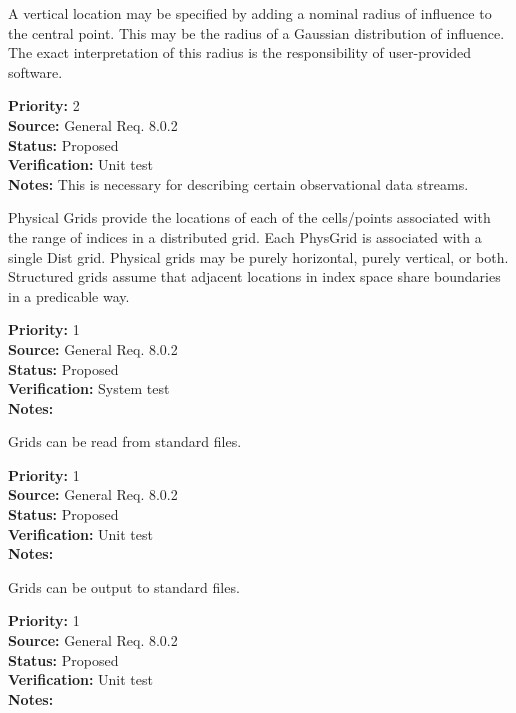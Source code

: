 
  A vertical location may be specified by adding a nominal radius of
influence to the central point.  This may be the radius of a Gaussian
distribution of influence. The exact interpretation of this radius is
the responsibility of user-provided software.
\begin{reqlist}
{\bf Priority:} 2 \\
{\bf Source:} General Req. 8.0.2 \\
{\bf Status:} Proposed \\
{\bf Verification:} Unit test\\
{\bf Notes:} This is necessary for describing certain observational data streams.
\end{reqlist}


Physical Grids provide the locations of each of the cells/points associated with
the range of indices in a distributed grid.  Each PhysGrid is associated with a
single Dist grid.  Physical grids may be purely horizontal, purely vertical, or
both.  Structured grids assume that adjacent locations in index space share
boundaries in a predicable way.
\begin{reqlist}
{\bf Priority:} 1 \\
{\bf Source:} General Req. 8.0.2 \\
{\bf Status:} Proposed \\
{\bf Verification:} System test\\
{\bf Notes:} 
\end{reqlist}


Grids can be read from standard files.
\begin{reqlist}
{\bf Priority:} 1 \\
{\bf Source:} General Req. 8.0.2 \\
{\bf Status:} Proposed \\
{\bf Verification:} Unit test\\
{\bf Notes:} 
\end{reqlist}


Grids can be output to standard files.
\begin{reqlist}
{\bf Priority:} 1 \\
{\bf Source:} General Req. 8.0.2 \\
{\bf Status:} Proposed \\
{\bf Verification:} Unit test\\
{\bf Notes:} 
\end{reqlist}

